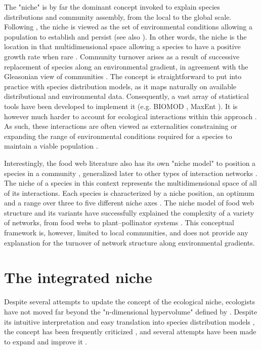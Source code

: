 \documentclass[12pt]{article}
\begin{document}
The "niche" is by far the dominant concept invoked to explain species
distributions and community assembly, from the local to the global scale.
Following \citet{Hutchinson1957}, the niche is viewed as the set of
environmental conditions allowing a population to establish and persist (see
also \citealt{Holt2009a}). In other words, the niche is the location in that
multidimensional space allowing a species to have a positive growth rate
when rare \citep{Godsoe2017}.  Community turnover arises as a result of
successive replacement of species along an environmental gradient, in
agreement with the Gleasonian view of communities \citep{Gleason1926}. The
concept is straightforward to put into practice with species distribution
models, as it maps naturally on available distributional and environmental
data. Consequently, a vast array of statistical tools have been developed to
implement it (e.g. BIOMOD \citealt{Thuiller2003}, MaxEnt
\citealt{Phillips2006}). It is however much harder to account for ecological
interactions within this approach \citep{Peterson2011}. As such, these
interactions are often viewed as externalities constraining or expanding the
range of environmental conditions required for a species to maintain a viable
population \citep{Pulliam2000, Soberon2007}.

Interestingly, the food web literature also has its own "niche model" to
position a species in a community \citep{Williams2000a}, generalized later to
other types of interaction networks \citep{Eklof2013}. The niche of a species
in this context represents the multidimensional space of all of its
interactions. Each species is characterized by a niche position, an optimum
and a range over three to five different niche axes \citep{Williams2000a,
Eklof2013}. The niche model of food web structure and its variants have
successfully explained the complexity of a variety of networks, from food webs
to plant–pollinator systems \citep{Allesina2008, Williams2010, Eklof2013}.
This conceptual framework is, however, limited to local communities, and does
not provide any explanation for the turnover of network structure along
environmental gradients.

\section*{The integrated niche}

Despite several attempts to update the concept of the ecological niche,
ecologists have not moved far beyond the "n-dimensional hypervolume" defined
by \citet{Hutchinson1957}. Despite its intuitive interpretation and easy
translation into species distribution models \citep{Boulangeat2012,
Blonder2014}, the concept has been frequently criticized \citep{Hardin1960,
Peters1991, Silvertown2004}, and several attempts have been made to expand and
improve it \citep{Pulliam2000, Chase2003, Soberon2007, Holt2009a,
McInerny2012b}.
\end{document}
